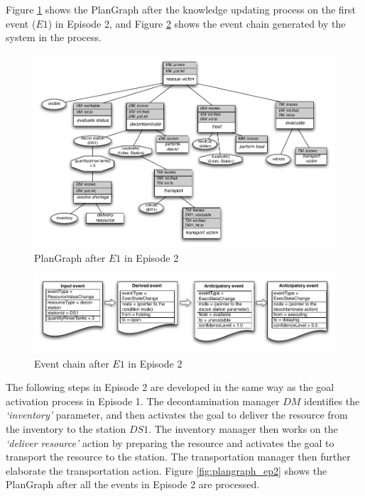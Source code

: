 Figure \ref{fig:plangraph_ep2_e1} shows the PlanGraph after the knowledge updating process on the first event ($E1$) in Episode 2, and Figure \ref{fig:eventchain_ep2_e1} shows the event chain generated by the system in the process.

\begin{figure}[htbp] %
	\centering
	\includegraphics[width=5.8in]{plangraph_ep2_e1.pdf} 
	\caption{PlanGraph after $E1$ in Episode 2}
	\label{fig:plangraph_ep2_e1}
\end{figure}

\begin{figure}[htbp] %
	\centering
	\includegraphics[width=5.8in]{eventchain_ep2_e1.pdf} 
	\caption{Event chain after $E1$ in Episode 2}
	\label{fig:eventchain_ep2_e1}
\end{figure}

The following steps in Episode 2 are developed in the same way as the goal activation process in Episode 1. The decontamination manager $DM$ identifies the \emph{`inventory'} parameter, and then activates the goal to deliver the resource from the inventory to the station $DS1$. The inventory manager then works on the \emph{`deliver resource'} action by preparing the resource and activates the goal to transport the resource to the station. The transportation manager then further elaborate the transportation action. Figure \ref{fig:plangraph_ep2} shows the PlanGraph after all the events in Episode 2 are processed.

